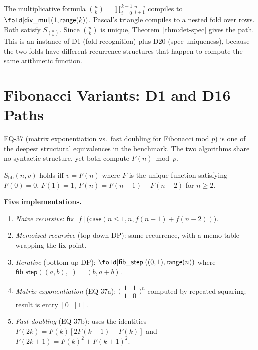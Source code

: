 \begin{remark}
The multiplicative formula
$\binom{n}{k} = \prod_{i=0}^{k-1} \frac{n-i}{i+1}$
compiles to
$\fold[\mathsf{div\_mul}](1, \mathsf{range}(k))$.
Pascal's triangle compiles to a nested fold over rows.
Both satisfy $S_{\binom{n}{k}}$.  Since $\binom{n}{k}$ is unique,
Theorem~\ref{thm:det-spec} gives the path.  This is an instance of
D1 (fold recognition) plus D20 (spec uniqueness), because the two
folds have different recurrence structures that happen to compute
the same arithmetic function.
\end{remark}

\section{Fibonacci Variants: D1 and D16 Paths}
\label{sec:fibonacci-variants}

EQ-37 (matrix exponentiation vs.\ fast doubling for Fibonacci mod $p$)
is one of the deepest structural equivalences in the benchmark.  The
two algorithms share no syntactic structure, yet both compute
$F(n) \bmod p$.

\begin{definition}
$S_{\mathrm{fib}}(n, v)$ holds iff $v = F(n)$ where $F$ is the unique
function satisfying $F(0) = 0$, $F(1) = 1$,
$F(n) = F(n{-}1) + F(n{-}2)$ for $n \ge 2$.
\end{definition}

\noindent\textbf{Five implementations.}
\begin{enumerate}
  \item \emph{Naive recursive}:
    $\mathsf{fix}[f]\bigl(\mathsf{case}(n \le 1, n,
      f(n{-}1) + f(n{-}2))\bigr)$.
  \item \emph{Memoized recursive} (top-down DP): same recurrence,
    with a memo table wrapping the fix-point.
  \item \emph{Iterative} (bottom-up DP):
    $\fold[\mathsf{fib\_step}]((0,1), \mathsf{range}(n))$ where
    $\mathsf{fib\_step}((\mathit{a},\mathit{b}), \_) =
      (\mathit{b}, \mathit{a}+\mathit{b})$.
  \item \emph{Matrix exponentiation} (EQ-37a):
    $\bigl(\begin{smallmatrix}1&1\\1&0\end{smallmatrix}\bigr)^n$
    computed by repeated squaring; result is entry $[0][1]$.
  \item \emph{Fast doubling} (EQ-37b): uses the identities
    $F(2k) = F(k)[2F(k{+}1) - F(k)]$ and
    $F(2k{+}1) = F(k)^2 + F(k{+}1)^2$.
\end{enumerate}

